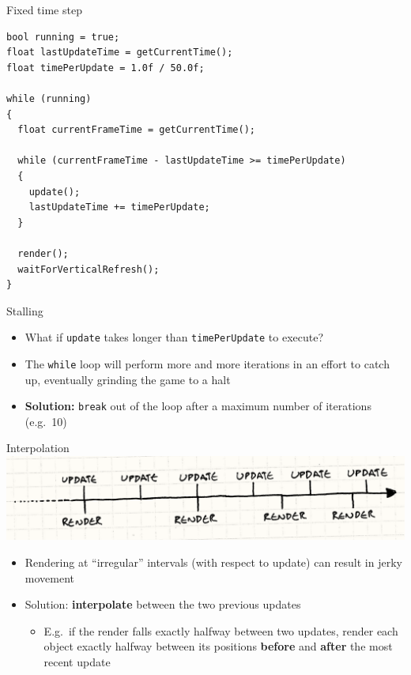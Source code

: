 \begin{frame}[fragile]{Fixed time step}
    \begin{lstlisting}
bool running = true;
float lastUpdateTime = getCurrentTime();
float timePerUpdate = 1.0f / 50.0f;

while (running)
{
  float currentFrameTime = getCurrentTime();

  while (currentFrameTime - lastUpdateTime >= timePerUpdate)
  {
    update();
    lastUpdateTime += timePerUpdate;
  }

  render();
  waitForVerticalRefresh();
}
    \end{lstlisting}
\end{frame}

\begin{frame}{Stalling}
    \begin{itemize}
        \pause\item What if \lstinline{update} takes longer than \lstinline{timePerUpdate} to execute? 
        \pause\item The \lstinline{while} loop will perform more and more iterations in an effort
            to catch up, eventually grinding the game to a halt 
        \pause\item \textbf{Solution:} \lstinline{break} out of the loop after a maximum number of iterations
            (e.g.\ 10)
    \end{itemize}
\end{frame}

\begin{frame}{Interpolation}
    \includegraphics[width=\textwidth]{game-loop-timeline}
    \begin{itemize}
        \pause\item Rendering at ``irregular'' intervals (with respect to update) can result in
            jerky movement 
        \pause\item Solution: \textbf{interpolate} between the two previous updates
            \begin{itemize}
                \pause\item E.g.\ if the render falls exactly halfway between two updates,
                    render each object exactly halfway between its positions
                    \textbf{before} and \textbf{after} the most recent update
            \end{itemize}
    \end{itemize}
\end{frame}

